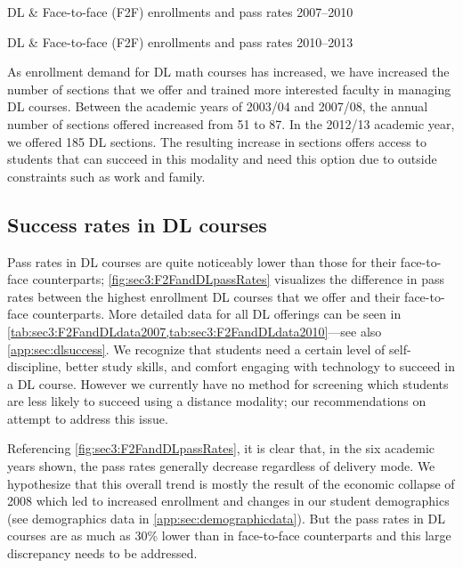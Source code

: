 \begin{table}[!htb]
	\begin{widepage}
	\centering
	\caption{DL \& Face-to-face (F2F) enrollments and pass rates 2007--2010}
	\label{tab:sec3:F2FandDLdata2007}
	
	\vspace{2pc}
	\caption{DL \& Face-to-face (F2F) enrollments and pass rates 2010--2013}
	\label{tab:sec3:F2FandDLdata2010}
	
	\end{widepage}
\end{table}

As enrollment demand for DL math courses has increased, we have increased the number of sections that we offer and trained more interested faculty in managing DL courses.
Between the academic years of 2003/04 and 2007/08, the annual number of sections offered increased from 51 to 87.
In the 2012/13 academic year, we offered 185 DL sections.
The resulting increase in sections offers access to students that can succeed in this modality and need this option due to outside constraints such as work and family.

\subsection{Success rates in DL courses}
Pass rates in DL courses are quite noticeably lower than those for their face-to-face counterparts; \cref{fig:sec3:F2FandDLpassRates} visualizes the difference in pass rates between the highest enrollment DL courses that we offer and their face-to-face counterparts.
More detailed data for all DL offerings can be seen in \cref{tab:sec3:F2FandDLdata2007,tab:sec3:F2FandDLdata2010}---see also \vref{app:sec:dlsuccess}.
We recognize that students need a certain level of self-discipline, better study skills, and comfort engaging with technology to succeed in a DL course.
However we currently have no method for screening which students are less likely to succeed using a distance modality; our recommendations on  attempt to address this issue.

Referencing \cref{fig:sec3:F2FandDLpassRates}, it is clear that, in the six academic years shown, the pass rates generally decrease regardless of delivery mode.
We hypothesize that this overall trend is mostly the result of the economic collapse of 2008 which led to increased enrollment and changes in our student demographics (see demographics data in \vref{app:sec:demographicdata}).
But the pass rates in DL courses are as much as 30\% lower than in face-to-face counterparts and this large discrepancy needs to be addressed.


